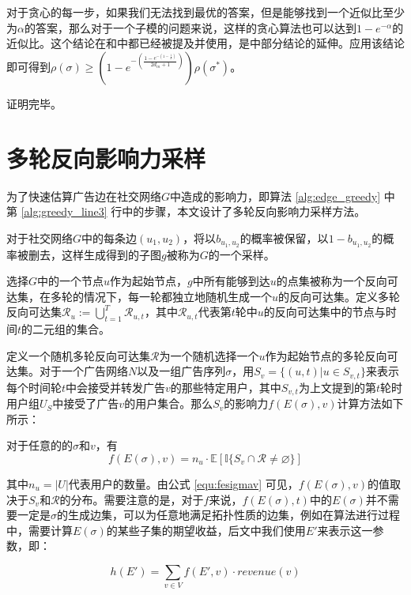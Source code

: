 对于贪心的每一步，如果我们无法找到最优的答案，但是能够找到一个近似比至少为$\alpha$的答案，那么对于一个子模的问题来说，这样的贪心算法也可以达到$1-e^{-\alpha}$的近似比。这个结论在\parencite{mrim}和\parencite{goundan2007revisiting}中都已经被提及并使用，是\parencite{nemhauser1978analysis}中部分结论的延伸。应用该结论即可得到$\rho(\sigma)\ge (1-e^{-(\frac{1-e^{-(1-\frac{1}{k})}}{2d_{in}+1})})\rho(\sigma^*)$。

\noindent 证明完毕。

\section{多轮反向影响力采样}
\label{sec:mrris}
为了快速估算广告边在社交网络$G$中造成的影响力，即算法 \ref{alg:edge_greedy} 中第 \ref{alg:greedy_line3} 行中的步骤，本文设计了多轮反向影响力采样方法。

对于社交网络$G$中的每条边$(u_1,u_2)$，将以$b_{u_1,u_2}$的概率被保留，以$1-b_{u_1,u_2}$的概率被删去，这样生成得到的子图$g$被称为$G$的一个采样。

选择$G$中的一个节点$u$作为起始节点，$g$中所有能够到达$u$的点集被称为一个反向可达集，在多轮的情况下，每一轮都独立地随机生成一个$u$的反向可达集。定义多轮反向可达集$\mathcal{R}_u := \bigcup_{t=1}^{T}\mathcal{R}_{u,t}$，其中$\mathcal{R}_{u,t}$代表第$t$轮中$u$的反向可达集中的节点与时间$t$的二元组的集合。

定义一个随机多轮反向可达集$\mathcal{R}$为一个随机选择一个$u$作为起始节点的多轮反向可达集。对于一个广告网络$N$以及一组广告序列$\sigma$，用$S_v =\{(u,t) | u\in S_{v,t}\}$来表示每个时间轮$t$中会接受并转发广告$v$的那些特定用户，其中$S_{v,t}$为上文提到的第$t$轮时用户组$U_S$中接受了广告$v$的用户集合。那么$S_v$的影响力$f(E(\sigma), v)$计算方法如下所示：

\begin{lemma}
对于任意的的$\sigma$和$v$，有
\begin{equation}
    \label{equ:fesigmav}
    f(E(\sigma), v)=n_u \cdot\mathbb{E}[\mathbb{I}\{S_v\cap\mathcal{R}\ne \varnothing \}]
\end{equation}
\end{lemma}
\noindent 其中$n_u=|U|$代表用户的数量。由公式 \ref{equ:fesigmav} 可见，$f(E(\sigma),v)$的值取决于$S_v$和$\mathcal{R}$的分布。需要注意的是，对于$f$来说，$f(E(\sigma),t)$中的$E(\sigma)$并不需要一定是$\sigma$的生成边集，可以为任意地满足拓扑性质的边集，例如在算法进行过程中，需要计算$E(\sigma)$的某些子集的期望收益，后文中我们使用$E'$来表示这一参数，即：

\begin{equation}
    h(E')=\sum_{v \in V}f(E',v)\cdot revenue(v)
\end{equation}


